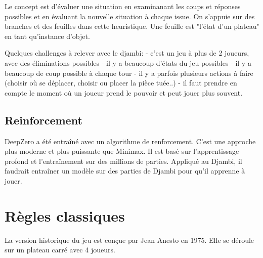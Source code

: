 \documentclass{article}
\begin{document}
Le concept est d'évaluer une situation en examinanant les coups et réponses possibles et en évaluant la nouvelle situation à chaque issue.
On s'appuie sur des branches et des feuilles dans cette heuristique. Une feuille est "l'état d'un plateau" en tant qu'instance d'objet.

Quelques challenges à relever avec le djambi: 
- c'est un jeu à plus de 2 joueurs, avec des éliminations possibles
- il y a beaucoup d'états du jeu possibles
- il y a beaucoup de coup possible à chaque tour
- il y a parfois plusieurs actions à faire (choisir où se déplacer, choisir ou placer la pièce tuée..)
- il faut prendre en compte le moment où un joueur prend le pouvoir et peut jouer plus souvent.



\subsection{Reinforcement}

DeepZero a été entraîné avec un algorithme de renforcement. C'est une approche plus moderne et plus puissante que Minimax.
Il est basé sur l'apprentissage profond et l'entraînement sur des millions de parties.
Appliqué au Djambi, il faudrait entraîner un modèle sur des parties de Djambi pour qu'il apprenne à jouer.



\newpage



\section{Règles classiques}
La version historique du jeu est conçue par Jean Anesto en 1975.
Elle se déroule sur un plateau carré avec 4 joueurs.
\end{document}
